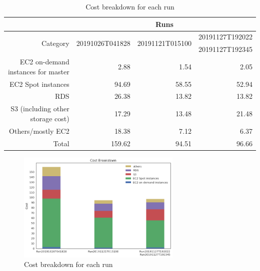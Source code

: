 \begin{table}[h!]
\centering
\begin{tabular} {|r|r|r|r|}
\hline
{}&\multicolumn{3}{c|}{Runs} \\ \hline
\multirow{2}{*}{Category}&\multirow{2}{*}{20191026T041828}&\multirow{2}{*}{20191121T015100}&{20191127T192022}\\
&&&{20191127T192345}\\ \hline
{EC2 on-demand instances for master}& 2.88 &1.54 &2.05\\
{EC2 Spot instances}&94.69&58.55 &52.94\\
{RDS}&26.38&13.82 & 13.82\\
{S3 (including other storage cost)}&17.29&13.48& 21.48\\
{Others/mostly EC2}&18.38 &7.12 &6.37\\ \hline
{Total}&159.62&94.51&96.66\\ \hline
\end{tabular} \normalsize
\caption{Cost breakdown for each run}
\label{tab:billBreakdown}
\end{table}

\begin{figure}[h]
\centering
\includegraphics[width=0.7\textwidth]{billBreakdown.png}
\caption{Cost breakdown for each run}
\end{figure}
